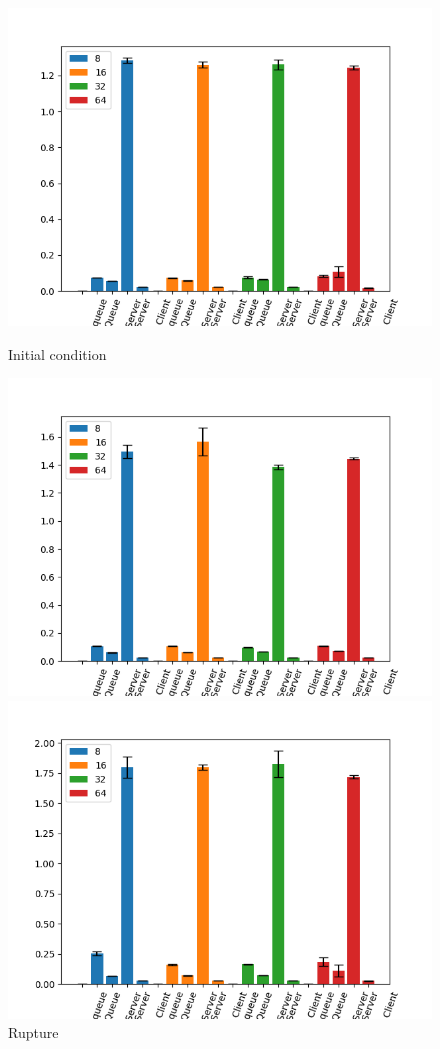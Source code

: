 \documentclass[11pt,a4paper]{article}
\begin{document}
\begin{figure}[H] 
  \label{ fig7} 
  \begin{minipage}[b]{0.5\linewidth}
    \centering
    \includegraphics[width=0.7\linewidth]{img/exp4_1/exp4_1_mw_percentile_plots_writes_1__vc_1.png} 
    \caption{Initial condition} 
    \vspace{4ex}
  \end{minipage}%
  \begin{minipage}[b]{0.5\linewidth}
    \centering
    \includegraphics[width=0.7\linewidth]{img/exp4_1/exp4_1_mw_percentile_plots_writes_1__vc_2.png} 
    \caption{Rupture} 
    \vspace{4ex}
  \end{minipage} 
  \begin{minipage}[b]{0.5\linewidth}
    \centering
    \includegraphics[width=0.7\linewidth]{img/exp4_1/exp4_1_mw_percentile_plots_writes_1__vc_4.png} 

\end{minipage}
\end{figure}
\end{document}
